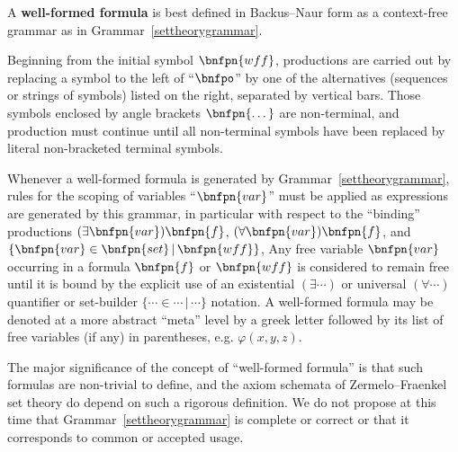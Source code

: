 \documentclass[letterpaper]{article}
\begin{document}
\begin{definition}
A \textbf{well-formed formula} is best defined in Backus--Naur form as a context-free grammar as in Grammar~\ref{settheorygrammar}.

Beginning from the initial symbol $\bnfpn{wff}$, productions are carried out by replacing a symbol to the left of ``$\bnfpo$'' by one of the alternatives (sequences or strings of symbols) listed on the right, separated by vertical bars.  Those symbols enclosed by angle brackets $\bnfpn{\dots}$ are non-terminal, and production must continue until all non-terminal symbols have been replaced by literal non-bracketed terminal symbols.


Whenever a well-formed formula is generated by Grammar~\ref{settheorygrammar}, rules for the scoping of variables ``$\bnfpn{var}$'' must be applied as expressions are generated by this grammar, in particular with respect to the ``binding'' productions
$(\exists\bnfpn{var})\bnfpn{f}$, 
$(\forall\bnfpn{var})\bnfpn{f}$, and
$\{\bnfpn{var}\in\bnfpn{set}\,|\,\bnfpn{wff}\}$,
Any free variable $\bnfpn{var}$ occurring in a formula $\bnfpn{f}$ or $\bnfpn{wff}$ is considered to remain free until it is bound by the explicit use of an existential $(\exists\cdots)$ or universal $(\forall\cdots)$ quantifier or set-builder $\{\cdots\in\cdots\,|\,\cdots\}$ notation.  A well-formed formula may be denoted at a more abstract ``meta'' level by a greek letter followed by its list of free variables (if any) in parentheses, e.g. $\varphi(x,y,z)$.

The major significance of the concept of ``well-formed formula'' is that such formulas are non-trivial to define, and the axiom schemata of Zermelo--Fraenkel set theory do depend on such a rigorous definition.  We do not propose at this time that Grammar~\ref{settheorygrammar} is complete or correct or that it corresponds to common or accepted usage.
\end{definition}
\end{document}
